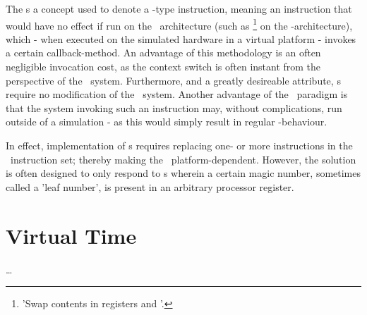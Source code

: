 The \dvttermmagicinstruction s a concept used to denote a -type instruction, meaning an instruction that would have no effect if run on the \dvttermtarget\ architecture (such as \footnote{'Swap contents in registers  and '.} on the \dvttermxeightysix -architecture), which - when executed on the simulated hardware in a virtual platform - invokes a certain callback-method.
An advantage of this methodology is an often negligible invocation cost, as the context switch is often instant from the perspective of the \dvttermtarget\ system.
Furthermore, and a greatly desireable attribute, \dvttermmagicinstruction s require no modification of the \dvttermtarget\ system.
Another advantage of the \dvttermmagicinstruction\ paradigm is that the system invoking such an instruction may, without complications, run outside of a simulation - as this would simply result in regular -behaviour.

In effect, implementation of \dvttermmagicinstruction s requires replacing one- or more instructions in the \dvttermtarget\ instruction set; thereby making the \dvttermmagicinstruction\ platform-dependent.
However, the solution is often designed to only respond to \dvttermmagicinstruction s wherein a certain magic number, sometimes called a 'leaf number', is present in an arbitrary processor register.

\section*{Virtual Time}
\label{sec:background_virtualtime}
\ldots
